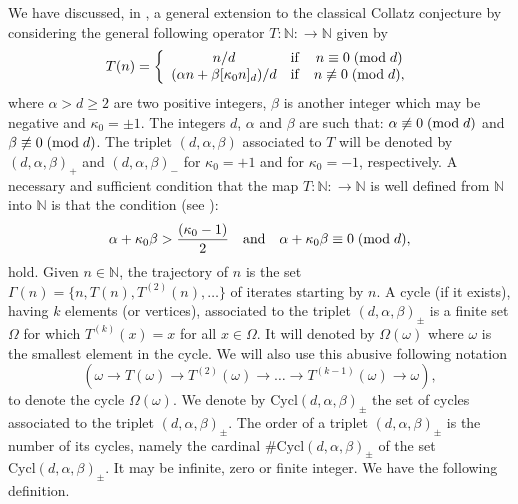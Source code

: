 \documentclass[11pt,a4paper]{article}
\newcommand*\modd[3]{#1\equiv#2\;( {\rm mod}\;  #3)}
\newcommand*\notmodd[3]{#1\not\equiv#2\;( {\rm mod}\;  #3)}
\begin{document}
We have discussed, in \cite{Bouhamidi_Hal2024},  a general   extension to the classical Collatz conjecture by considering the general following operator $T:\mathbb{N}:\longrightarrow \mathbb{N}$ given by
\begin{equation}\label{mapT}
	T(n)=\left\{\begin{array}{ccc}
		n/d&\mathrm{if}& \modd{n}{0}{d}\\
		(\alpha n+\beta [\kappa_0 n]_d)/d&\mathrm{if}& \notmodd{n}{0}{d},\\
	\end{array}\right.
\end{equation}
where  $\alpha> d \geq2$  are two  positive integers, $\beta$ is  another integer which may be negative and $\kappa_0=\pm1$.  The integers  $d$, $\alpha$ and $\beta$  are  such that:   $\notmodd{\alpha}{0}{d}$ and  $\notmodd{\beta}{0}{d}$.   The triplet $(d,\alpha,\beta)$ associated to $T$  will be  denoted by $(d,\alpha,\beta)_{\pmb{+}}$ and 
$(d,\alpha,\beta)_{\pmb{-}}$ for $\kappa_0=+1$ and for $\kappa_0=-1$, respectively. A necessary and sufficient condition that the map $T:\mathbb{N}:\longrightarrow \mathbb{N}$  is well defined from $ \mathbb{N}$ into $\mathbb{N}$ is that the condition (see \cite{Bouhamidi_Hal2024}):
\begin{equation}\label{CdtCollatztriplet}
	\alpha+\kappa_0\beta>\dfrac{(\kappa_0-1)}{2}\quad\textrm{and}\quad \modd{\alpha+\kappa_0\beta}{0}{d},
\end{equation}
hold. 
Given $n\in \mathbb{N}$, the  trajectory of $n$ is the set $\Gamma(n)=\{n,T(n),T^{(2)}(n),\ldots\}$ of iterates starting by $n$.  A cycle (if it exists),  having $k$ elements (or vertices),  associated to the triplet $(d,\alpha,\beta)_{\pmb{\pm}}$  is a finite set  $\Omega $  for which $T^{(k)}(x)=x$ for all $x\in \Omega$.  It  will denoted by  
$\Omega(\omega)$ where $\omega$ is the smallest element in  the cycle. 
We will also use this abusive following  notation 
$$(\omega \rightarrow T(\omega)\rightarrow T^{(2)}(\omega)\rightarrow \ldots \rightarrow T^{(k-1)}(\omega)\rightarrow \omega),$$
to denote  the  cycle $\Omega(\omega)$.  We denote by $\mathrm{Cycl}(d,\alpha,\beta)_{\pmb{\pm}}$ the set of cycles associated to the triplet $(d,\alpha,\beta)_{\pmb{\pm}}$. The order of a triplet $(d,\alpha,\beta)_{\pmb{\pm}}$ is the number of its cycles, namely the cardinal  $\#\mathrm{Cycl}(d,\alpha,\beta)_{\pmb{\pm}}$ of the set $\mathrm{Cycl}(d,\alpha,\beta)_{\pmb{\pm}}$. It may be  infinite, zero or  finite integer. We have the following definition.
\end{document}
